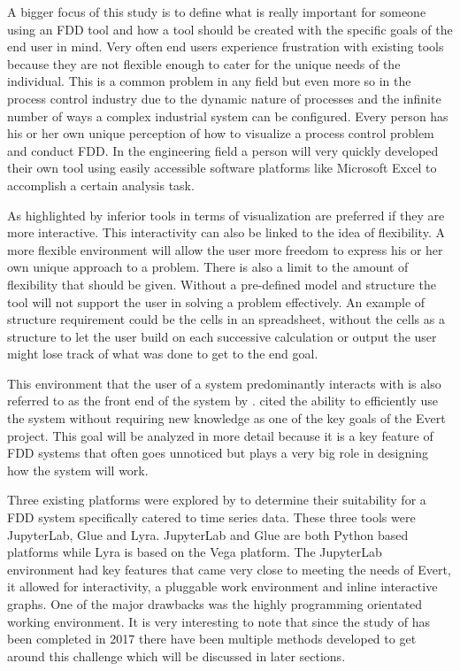 A bigger focus of this study is to define what is really important for someone using an FDD tool and how a tool should be created with the specific goals of the end user in mind. Very often end users experience frustration with existing tools because they are not flexible enough to cater for the unique needs of the individual. This is a common problem in any field but even more so in the process control industry due to the dynamic nature of processes and the infinite number of ways a complex industrial system can be configured. Every person has his or her own unique perception of how to visualize a process control problem and conduct FDD. In the engineering field a person will very quickly developed their own tool using easily accessible software platforms like Microsoft Excel to accomplish a certain analysis task.

As highlighted by \cite{saraiya2006insight} inferior tools in terms of visualization are preferred if they are more interactive. This interactivity can also be linked to the idea of flexibility. A more flexible environment will allow the user more freedom to express his or her own unique approach to a problem. There is also a limit to the amount of flexibility that should be given. Without a pre-defined model and structure the tool will not support the user in solving a problem effectively. An example of structure requirement could be the cells in an  spreadsheet, without the cells as a structure to let the user build on each successive calculation or output the user might lose track of what was done to get to the end goal.

This environment that the user of a system predominantly interacts with is also referred to as the front end of the system by \cite{Herbst2017}. \cite{Herbst2017} cited the ability to efficiently use the system without requiring new knowledge as one of the key goals of the Evert project. This goal will be analyzed in more detail because it is a key feature of FDD systems that often goes unnoticed but plays a very big role in designing how the system will work.

Three existing platforms were explored by \cite{Herbst2017} to determine their suitability for a FDD system specifically catered to time series data. These three tools were JupyterLab, Glue and Lyra. JupyterLab and Glue are both Python based platforms while Lyra is based on the Vega platform. The JupyterLab environment had key features that came very close to meeting the needs of Evert, it allowed for interactivity, a pluggable work environment and inline interactive graphs. One of the major drawbacks was the highly programming orientated working environment. It is very interesting to note that since the study of \cite{Herbst2017} has been completed in 2017 there have been multiple methods developed to get around this challenge which will be discussed in later sections.

